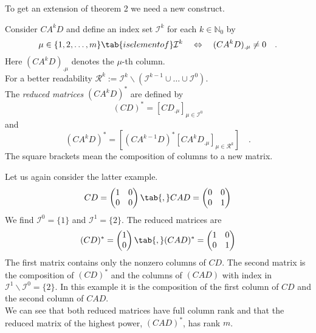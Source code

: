 To get an extension of theorem 2 we need a new construct. 
\begin{definition}{}{}
	Consider $CA^kD$ and define an index set $\mathcal{I}^k$ for each $k\in\mathbb{N}_0$
	by 
	\begin{equation}
	\mu \in\{1,2,\ldots,m\} \tab{is element of} \mathcal{I}^k \quad \Leftrightarrow 
	\quad  (CA^kD)_{. \mu} \neq 0  \quad . 
\end{equation}		
	Here $(CA^kD)_{.\mu}$ denotes the $\mu$-th column. \\
	
	For a better readability $\mathcal{R}^k:= 
	\mathcal{I}^k\backslash (\mathcal{I}^{k-1}\cup \ldots \cup \mathcal{I}^0)$.\\

	The \textit{reduced matrices} $(CA^kD)^*$ are defined by
	\begin{equation}
	(CD)^* = \left[ CD_{.\mu} \right]_{\mu \in \mathcal{I}^0}
	\end{equation}
	and 
	\begin{equation}
	(CA^kD)^* = \left[ (CA^{k-1}D)^* \left[ CA^kD_{.\mu}  \right]_{\mu\in\mathcal{R}^k} 
	\right]	 \quad .
	\end{equation}
	The square brackets mean the composition of columns to a new matrix.
\end{definition}

\begin{example}{}{}
	Let us again consider the latter example.
	\begin{equation}
	CD = \begin{pmatrix}
	1 & 0 \\ 0 & 0
	\end{pmatrix}
	\tab{,} CAD = \begin{pmatrix}
	0 & 0 \\ 0 & 1
	\end{pmatrix} 
	\end{equation}
	We find $\mathcal{I}^0=\{1\}$ and $\mathcal{I}^1 =\{2\}$. The reduced matrices are
	\begin{equation}
	(CD)^* = \begin{pmatrix}
	1 \\ 0
	\end{pmatrix}
	\tab{,} 
	(CAD)^* = \begin{pmatrix}
	1 & 0 \\ 0 & 1
	\end{pmatrix}
	\end{equation}
	The first matrix contains only the nonzero columns of $CD$.
	The second matrix is the composition of $(CD)^*$ and the columns of $(CAD)$ with index 
	in $\mathcal{I}^1\backslash\mathcal{I}^0 =\{2\}$. In this example it is the composition 
	of the first column of $CD$ and the second column of $CAD$. \\
	We can see that both reduced matrices have full column rank and that the reduced 
	matrix of the highest power, $(CAD)^*$, has rank $m$. 
\end{example}


